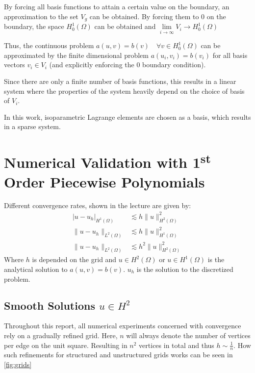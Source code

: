 \documentclass[11pt,a4paper]{article}
\begin{document}
\begin{multicols}{2}
By forcing all basis functions to attain a certain value on the boundary, an
approximation to the set $V_g$ can be obtained. By forcing them to 0 on the
boundary, the space $H^1_0(\Omega)$ can be obtained and
$\lim\limits_{i\to\infty}V_i \to H^1_0(\Omega)$

Thus, the continuous problem $a(u,v) = b(v) \quad \forall v \in H^1_0(\Omega)$
can be approximated by the finite dimensional problem $a(u_i,v_i) = b(v_i)$ for all
basis vectors $v_i \in V_i$ (and explicitly enforcing the 0 boundary condition).

Since there are only a finite number of basis functions, this results in a linear system
where the properties of the system heavily depend on the choice of basis of $V_i$.

In this work, isoparametric Lagrange elements are chosen as a basis,
which results in a sparse system.

\section*{Numerical Validation with 1\textsuperscript{st} Order Piecewise Polynomials}
Different convergence rates, shown in the lecture are given by:
\begin{equation}
  \begin{split}
    \left|u-u_h\right|_{H^1(\Omega)} &\lesssim h \lVert u\rVert^2_{H^2(\Omega)}\\
    \lVert u - u_h \rVert_{L^2(\Omega)} &\lesssim h\lVert u\rVert^2_{H^1(\Omega)}\\
    \lVert u - u_h \rVert_{L^2(\Omega)} &\lesssim h^2\lVert u\rVert^2_{H^2(\Omega)}
  \end{split}
\end{equation}
Where $h$ is depended on the grid and $u \in H^2(\Omega)$ or $u \in H^1(\Omega)$
is the analytical solution to $a(u,v) = b(v)$.
$u_h$ is the solution to the discretized problem.

\subsection*{Smooth Solutions $u \in H^2$}
Throughout this report, all numerical experiments concerned with convergence rely
on a gradually refined grid. Here, $n$ will always denote the number of vertices
per edge on the unit square. Resulting in $n^2$ vertices in total and thus $h \sim \frac{1}{n}$.
How such refinements for structured and unstructured grids works can be seen in \autoref{fig:grids}


\end{multicols}
\end{document}
